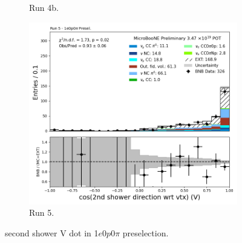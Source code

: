 \begin{figure}[H]
\begin{subfigure}[t]{0.32\linewidth}
        \caption{Run 4b.}
    \end{subfigure}%
    \hspace{0.2cm}%
    \begin{subfigure}[t]{0.32\linewidth}
        \includegraphics[width=\linewidth]{technote/Appendix_Preselection/Figures/1e0p0pi/Run5/secondshower_V_dot_Run5_1e0p0pi_Presel.png}
        \caption{Run 5.}
    \end{subfigure}
    \caption{second shower V dot in 1$e$0$p$0$\pi$ preselection.}
\end{figure}

